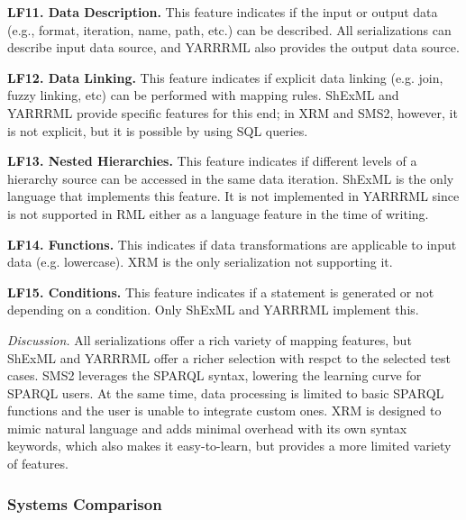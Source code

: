 \textbf{LF11. Data Description.}
This feature indicates if the input or output data (e.g., format, iteration, name, path, etc.) can be described. All serializations can describe input data source, and YARRRML also provides the output data source.

\textbf{LF12. Data Linking.}
This feature indicates if explicit data linking (e.g. join, fuzzy linking, etc) can be performed with mapping rules. ShExML and YARRRML provide specific features for this end; in XRM and SMS2, however, it is not explicit, but it is possible by using SQL queries. 

\textbf{LF13. Nested Hierarchies.}
This feature indicates if different levels of a hierarchy source can be accessed in the same data iteration. ShExML is the only language that implements this feature. It is not implemented in YARRRML since is not supported in RML either as a language feature in the time of writing. 

\textbf{LF14. Functions.}
This indicates if data transformations are applicable to input data (e.g. lowercase). XRM is the only serialization not supporting it. 

\textbf{LF15. Conditions.}
This feature indicates if a statement is generated or not depending on a condition. Only ShExML and YARRRML implement this.

\textit{Discussion.} 
All serializations offer a rich variety of mapping features, but ShExML and YARRRML offer a richer selection with respct to the selected test cases. SMS2 leverages the SPARQL syntax, lowering the learning curve for SPARQL users. At the same time, data processing is limited to basic SPARQL functions and the user is unable to integrate custom ones. 
XRM is designed to mimic natural language and adds minimal overhead with its own syntax keywords, which also makes it easy-to-learn, but provides a more limited variety of features.


\subsubsection{Systems Comparison} 




